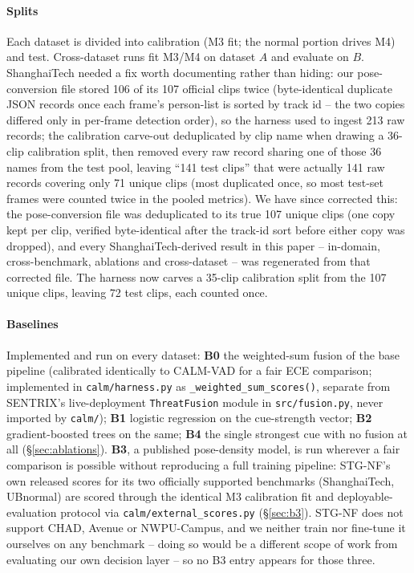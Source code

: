 \documentclass[conference]{IEEEtran}
\newcommand{\method}{CALM-VAD}
\begin{document}
\paragraph{Splits}
Each dataset is divided into calibration (M3 fit; the normal portion drives
M4) and test. Cross-dataset runs fit M3/M4 on dataset $A$ and evaluate on $B$.
ShanghaiTech needed a fix worth documenting rather than hiding: our
pose-conversion file stored 106 of its 107 official clips twice
(byte-identical duplicate JSON records once each frame's person-list is
sorted by track id -- the two copies differed only in per-frame detection
order), so the harness used to ingest 213 raw records; the calibration
carve-out deduplicated by clip name when drawing a 36-clip calibration split,
then removed every raw record sharing one of those 36 names from the test
pool, leaving ``141 test clips'' that were actually 141 raw records covering
only 71 unique clips (most duplicated once, so most test-set frames were
counted twice in the pooled metrics). We have since corrected this: the
pose-conversion file was deduplicated to its true 107 unique clips (one copy
kept per clip, verified byte-identical after the track-id sort before either
copy was dropped), and every ShanghaiTech-derived result in this paper --
in-domain, cross-benchmark, ablations and cross-dataset -- was regenerated
from that corrected file. The harness now carves a 35-clip calibration split
from the 107 unique clips, leaving 72 test clips, each counted once.

\paragraph{Baselines}
Implemented and run on every dataset: \textbf{B0} the weighted-sum fusion of
the base pipeline (calibrated identically to \method{} for a fair ECE
comparison; implemented in \texttt{calm/harness.py} as
\texttt{\_weighted\_sum\_scores()}, separate from SENTRIX's live-deployment
\texttt{ThreatFusion} module in \texttt{src/fusion.py}, never imported by
\texttt{calm/}); \textbf{B1} logistic regression on the cue-strength vector;
\textbf{B2} gradient-boosted trees on the same; \textbf{B4} the single
strongest cue with no fusion at all (\S\ref{sec:ablations}).
\textbf{B3}, a published pose-density model, is run wherever a fair
comparison is possible without reproducing a full training pipeline:
STG-NF's own released scores \cite{stgnf2023} for its two officially
supported benchmarks (ShanghaiTech, UBnormal) are scored through the
identical M3 calibration fit and deployable-evaluation protocol via
\texttt{calm/external\_scores.py} (\S\ref{sec:b3}). STG-NF does not support
CHAD, Avenue or NWPU-Campus, and we neither train nor fine-tune it ourselves
on any benchmark -- doing so would be a different scope of work from
evaluating our own decision layer -- so no B3 entry appears for those three.
\end{document}
